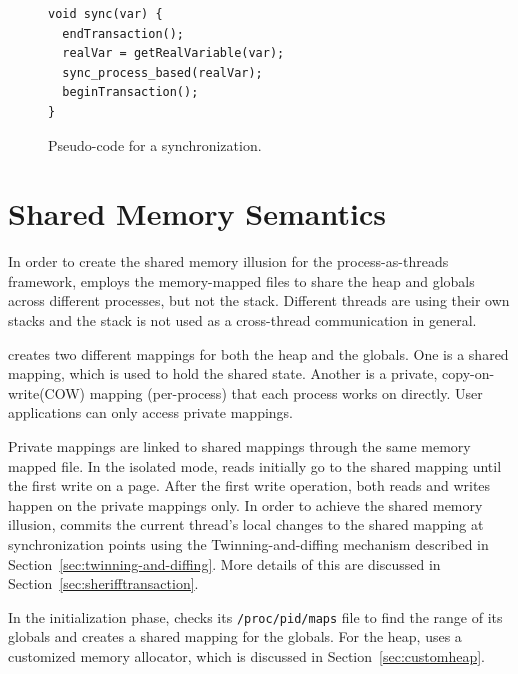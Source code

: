 \begin{figure}[!t]
\small
\begin{lstlisting}[style=tt]
void sync(var) {
  endTransaction();
  realVar = getRealVariable(var);
  sync_process_based(realVar);	
  beginTransaction();
}
\end{lstlisting}
\caption{Pseudo-code for a synchronization.\label{fig:synccode}}
\end{figure}

\section{Shared Memory Semantics}
\label{sec:sharedmemory}

In order to create the shared memory illusion for the process-as-threads framework, \sheriff{} employs the memory-mapped files to share the heap and globals across different processes, but not the stack. Different threads are using their own stacks and the stack is not used as a cross-thread communication in general.

\sheriff{} creates two different mappings for both the heap and the globals. One is a shared mapping, which is used to hold the shared state. Another is a private, copy-on-write(COW) mapping (per-process) that each process works on directly. User applications can only access  private mappings. 

Private mappings are linked to shared mappings through the same memory mapped file. In the isolated mode, reads initially go to the shared mapping until the first write on a page. After the first write operation, both reads and writes happen on the private mappings only. In order to achieve the shared memory illusion, \sheriff{} commits the current thread's local changes to the shared mapping at synchronization points using the Twinning-and-diffing mechanism described in Section~\ref{sec:twinning-and-diffing}. More details of this are discussed in Section~\ref{sec:sherifftransaction}.

In the initialization phase, \sheriff{} checks its \texttt{/proc/pid/maps} file to find the range of its globals and creates a shared mapping for the globals. For the heap, \sheriff{} uses a customized memory allocator, which is discussed in Section~\ref{sec:customheap}. 

